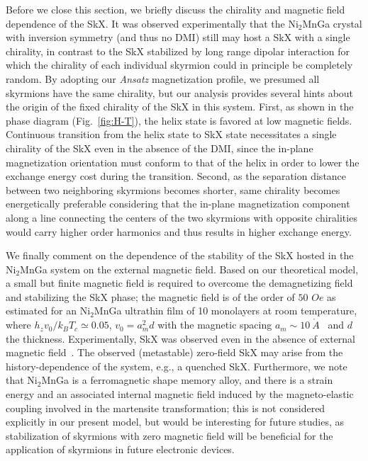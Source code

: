 \documentclass[10pt,onecolumn,prb,aps,notitlepage]{revtex4}
\begin{document}
Before we close this section, we briefly discuss the chirality and magnetic field dependence of the SkX. It was observed experimentally that the Ni$_{2}$MnGa crystal with inversion
symmetry (and thus no DMI) still may host a SkX with a single chirality, in
contrast to the SkX stabilized by long range dipolar interaction for which
the chirality of each individual skyrmion could in principle be completely random. By
adopting our {\it Ansatz} magnetization profile, we presumed all skyrmions have the same
chirality, but our analysis provides several hints about the origin of the fixed
chirality of the SkX in this system. First, as shown in the phase diagram
(Fig.~\ref{fig:H-T}), the helix state is favored at low magnetic fields. Continuous
transition from the helix state to SkX state necessitates a single chirality
of the SkX even in the absence of the DMI, since the in-plane magnetization
orientation must conform to that of the helix in order to lower the exchange
energy cost during the transition. Second, as the separation distance
between two neighboring skyrmions becomes shorter, same chirality becomes
energetically preferable considering that the in-plane magnetization
component along a line connecting the centers of the two skyrmions with
opposite chiralities would carry higher order harmonics and thus results in higher
exchange energy.

We finally comment on the dependence of the stability of the SkX hosted in the Ni$_{2}$MnGa system on the external magnetic field. Based on our theoretical model, a small but finite magnetic field is required to overcome the demagnetizing field and
stabilizing the SkX phase; the magnetic field is of the order of $50$ $Oe$ as estimated for an Ni$_2$MnGa ultrathin film of 10 monolayers at room temperature, where $h_z v_0/k_BT_c \simeq 0.05$, $v_0=a_m^2d$ with the magnetic spacing $a_m\sim 10~\mathring{A}$~\cite{RIGHI07ActaMater,Sakon13metals_NMG} and $d$ the thickness. Experimentally, SkX was observed even in the absence of external magnetic field~\cite{Phatak16NanoLett_skyrm-multiferro}. The observed (metastable) zero-field SkX may arise from the history-dependence of the system, e.g., a quenched SkX. Furthermore, we note that Ni$_{2}$MnGa
is a ferromagnetic shape memory alloy, and there is a strain energy and an associated internal
magnetic field induced by the magneto-elastic coupling involved in the martensite transformation; this is not
considered explicitly in our present model, but would be interesting for
future studies, as stabilization of skyrmions with zero magnetic field will be beneficial
for the application of skyrmions in future electronic devices.
\end{document}
